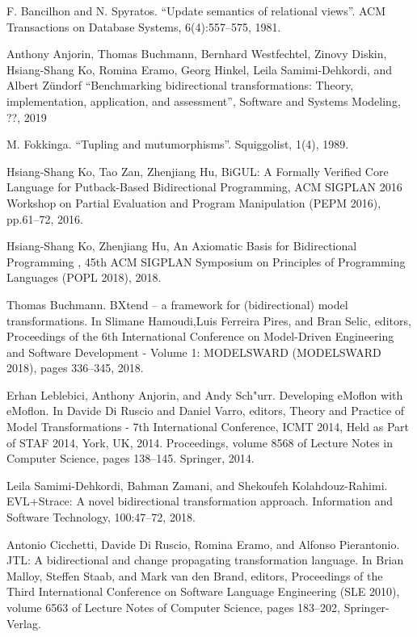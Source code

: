 \documentclass[runningheads]{llncs}
\begin{document}
% 
%
%
% 
% 
%
\begin{thebibliography}{8}
F. Bancilhon and N. Spyratos. ``Update semantics of relational views''. ACM Transactions on Database Systems, 6(4):557--575, 1981.

Anthony Anjorin, Thomas Buchmann, Bernhard Westfechtel, Zinovy Diskin, Hsiang-Shang Ko, Romina Eramo, Georg Hinkel, Leila Samimi-Dehkordi, and Albert Zündorf
``Benchmarking bidirectional transformations: Theory, implementation, application, and assessment'', Software and Systems Modeling, ??, 2019

  M. Fokkinga. ``Tupling and mutumorphisms''. Squiggolist, 1(4), 1989.

  Hsiang-Shang Ko, Tao Zan, Zhenjiang Hu, BiGUL: A Formally Verified Core Language for Putback-Based Bidirectional Programming, ACM SIGPLAN 2016 Workshop on Partial Evaluation and Program Manipulation (PEPM 2016), pp.61--72, 2016.

  Hsiang-Shang Ko, Zhenjiang Hu, An Axiomatic Basis for Bidirectional Programming , 45th ACM SIGPLAN Symposium on Principles of Programming Languages (POPL 2018), 2018.

  Thomas Buchmann. BXtend -- a framework for (bidirectional) model transformations. In Slimane Hamoudi,Luis Ferreira Pires, and Bran Selic, editors, Proceedings
of the 6th International Conference on Model-Driven Engineering and Software Development - Volume 1: MODELSWARD (MODELSWARD 2018), pages 336--345, 2018.

  Erhan Leblebici, Anthony Anjorin, and Andy Sch"{u}rr. Developing eMoflon with eMoflon. In Davide Di Ruscio and Daniel Varro, editors, Theory and Practice of Model Transformations - 7th International Conference, ICMT 2014, Held as Part of STAF 2014, York, UK, 2014. Proceedings, volume 8568 of Lecture Notes in
Computer Science, pages 138–145. Springer, 2014.

Leila Samimi-Dehkordi, Bahman Zamani, and Shekoufeh Kolahdouz-Rahimi. EVL+Strace: A novel bidirectional transformation approach. Information and Software
Technology, 100:47--72, 2018.

Antonio Cicchetti, Davide Di Ruscio, Romina Eramo, and Alfonso Pierantonio. JTL: A bidirectional and change propagating transformation language. In Brian Malloy, Steffen Staab, and Mark van den Brand, editors, Proceedings of the Third International Conference on Software Language Engineering (SLE 2010), volume 6563 of Lecture Notes of Computer Science, pages 183--202, Springer-Verlag.
  

\end{thebibliography}
\end{document}
